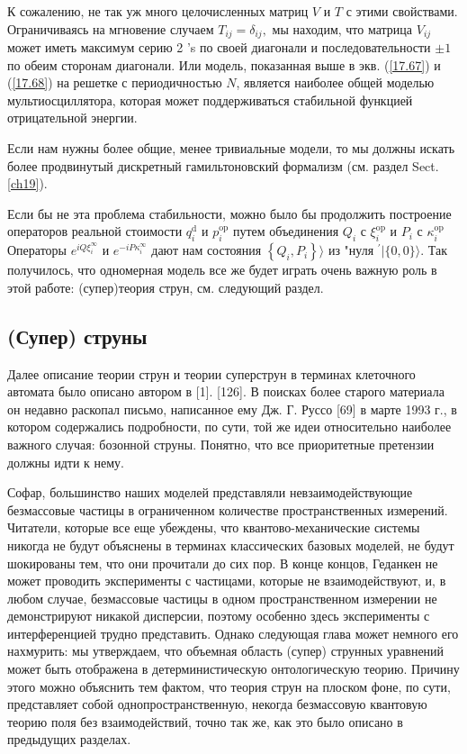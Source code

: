 \documentclass[main.tex]{subfiles}
\begin{document}
К сожалению, не так уж много целочисленных матриц $V$ и $T$ с этими свойствами. Ограничиваясь на мгновение случаем $T_{i j}=\delta_{i j},$ мы находим, что матрица $V_{i j}$ может иметь максимум серию 2 's по своей диагонали и последовательности $\pm 1$ по обеим сторонам диагонали. Или модель, показанная выше в экв. (\ref{17.67}) и (\ref{17.68}) на решетке с периодичностью $N$, является наиболее общей моделью мультиосциллятора, которая может поддерживаться стабильной функцией отрицательной энергии.

Если нам нужны более общие, менее тривиальные модели, то мы должны искать более продвинутый дискретный гамильтоновский формализм (см. раздел Sect. \ref{ch19}).

Если бы не эта проблема стабильности, можно было бы продолжить построение операторов реальной стоимости $q_{i}^{\mathrm{d}}$ и $p_{i}^{\mathrm{op}}$ путем объединения $Q_{i}$ с $\xi_{i}^{\mathrm{op}}$ и $P_{i}$ с $\kappa_{i}^{\mathrm{op}}$ Операторы $e^{i Q \xi_{i}^{\infty}}$ и $e^{-i P \kappa_{i}^{\infty}}$ дают нам состояния $\left\{Q_{i}, P_{i}\right\}\rangle$ из "нуля $^{\prime}|\{0,0\}\rangle$. Так получилось, что одномерная модель все же будет играть очень важную роль в этой работе: (супер)теория струн, см. следующий раздел.




\subsection{(Супер) струны}\label{ch17.3}

Далее описание теории струн и теории суперструн в терминах клеточного автомата было описано автором в [1]. [126]. В поисках более старого материала он недавно раскопал письмо, написанное ему Дж. Г. Руссо [69] в марте 1993 г., в котором содержались подробности, по сути, той же идеи относительно наиболее важного случая: бозонной струны. Понятно, что все приоритетные претензии должны идти к нему.

Софар, большинство наших моделей представляли невзаимодействующие безмассовые частицы в ограниченном количестве пространственных измерений. Читатели, которые все еще убеждены, что квантово-механические системы никогда не будут объяснены в терминах классических базовых моделей, не будут шокированы тем, что они прочитали до сих пор. В конце концов, Геданкен не может проводить эксперименты с частицами, которые не взаимодействуют, и, в любом случае, безмассовые частицы в одном пространственном измерении не демонстрируют никакой дисперсии, поэтому особенно здесь эксперименты с интерференцией трудно представить. Однако следующая глава может немного его нахмурить: мы утверждаем, что объемная область (супер) струнных уравнений может быть отображена в детерминистическую онтологическую теорию. Причину этого можно объяснить тем фактом, что теория струн на плоском фоне, по сути, представляет собой однопространственную, некогда безмассовую квантовую теорию поля без взаимодействий, точно так же, как это было описано в предыдущих разделах.
\end{document}
